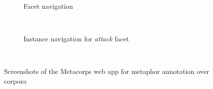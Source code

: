 \begin{figure}[t!]
    \centering
    \begin{subfigure}[b]{0.45\textwidth}
        \caption{Facet navigation}
    \end{subfigure}
    ~
    \begin{subfigure}[b]{0.45\textwidth}
        \caption{Instance navigation for \textit{attack} facet}
    \end{subfigure}
    ~
    \caption{Screenshots of the Metacorps web app for metaphor annotation over
        corpora}
    \label{fig:metacorps-screenshots}
\end{figure}

